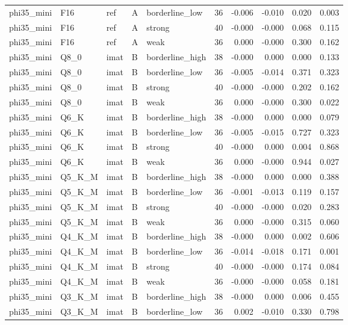 \begin{tabular}{lllllrrrrr}
phi35\_mini & F16 & ref & A & borderline\_low & 36 & -0.006 & -0.010 & 0.020 & 0.003 \\
phi35\_mini & F16 & ref & A & strong & 40 & -0.000 & -0.000 & 0.068 & 0.115 \\
phi35\_mini & F16 & ref & A & weak & 36 & 0.000 & -0.000 & 0.300 & 0.162 \\
phi35\_mini & Q8\_0 & imat & B & borderline\_high & 38 & -0.000 & 0.000 & 0.000 & 0.133 \\
phi35\_mini & Q8\_0 & imat & B & borderline\_low & 36 & -0.005 & -0.014 & 0.371 & 0.323 \\
phi35\_mini & Q8\_0 & imat & B & strong & 40 & -0.000 & -0.000 & 0.202 & 0.162 \\
phi35\_mini & Q8\_0 & imat & B & weak & 36 & 0.000 & -0.000 & 0.300 & 0.022 \\
phi35\_mini & Q6\_K & imat & B & borderline\_high & 38 & -0.000 & 0.000 & 0.000 & 0.079 \\
phi35\_mini & Q6\_K & imat & B & borderline\_low & 36 & -0.005 & -0.015 & 0.727 & 0.323 \\
phi35\_mini & Q6\_K & imat & B & strong & 40 & -0.000 & 0.000 & 0.004 & 0.868 \\
phi35\_mini & Q6\_K & imat & B & weak & 36 & 0.000 & -0.000 & 0.944 & 0.027 \\
phi35\_mini & Q5\_K\_M & imat & B & borderline\_high & 38 & -0.000 & 0.000 & 0.000 & 0.388 \\
phi35\_mini & Q5\_K\_M & imat & B & borderline\_low & 36 & -0.001 & -0.013 & 0.119 & 0.157 \\
phi35\_mini & Q5\_K\_M & imat & B & strong & 40 & -0.000 & -0.000 & 0.020 & 0.283 \\
phi35\_mini & Q5\_K\_M & imat & B & weak & 36 & 0.000 & -0.000 & 0.315 & 0.060 \\
phi35\_mini & Q4\_K\_M & imat & B & borderline\_high & 38 & -0.000 & 0.000 & 0.002 & 0.606 \\
phi35\_mini & Q4\_K\_M & imat & B & borderline\_low & 36 & -0.014 & -0.018 & 0.171 & 0.001 \\
phi35\_mini & Q4\_K\_M & imat & B & strong & 40 & -0.000 & -0.000 & 0.174 & 0.084 \\
phi35\_mini & Q4\_K\_M & imat & B & weak & 36 & -0.000 & -0.000 & 0.058 & 0.181 \\
phi35\_mini & Q3\_K\_M & imat & B & borderline\_high & 38 & -0.000 & 0.000 & 0.006 & 0.455 \\
phi35\_mini & Q3\_K\_M & imat & B & borderline\_low & 36 & 0.002 & -0.010 & 0.330 & 0.798 \\

\end{tabular}
